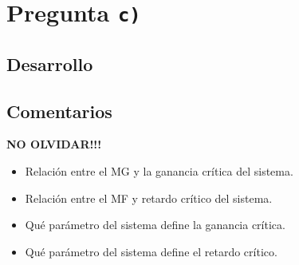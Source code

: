 \section{Pregunta \texttt{c)}}\label{pregunta-c}


\subsection{Desarrollo}


\FloatBarrier
\subsection{Comentarios}

\textbf{NO OLVIDAR!!!}


\begin{itemize}
  \item Relación entre el MG y la ganancia crítica del sistema.
  \item Relación entre el MF y retardo crítico del sistema.
  \item Qué parámetro del sistema define la ganancia crítica.
  \item Qué parámetro del sistema define el retardo crítico.
\end{itemize}